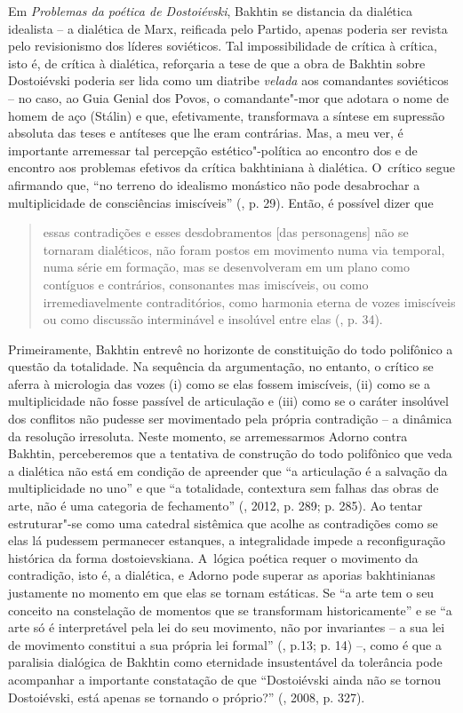 {{Em \emph{Problemas da poética de Dostoiévski}, Bakhtin se distancia da
dialética idealista -- a dialética de Marx, reificada pelo Partido,
apenas poderia ser revista pelo revisionismo dos líderes soviéticos. Tal
impossibilidade de crítica à crítica, isto é, de crítica à dialética,
reforçaria a tese de que a obra de Bakhtin sobre Dostoiévski poderia ser
lida como um diatribe \emph{velada} aos comandantes soviéticos -- no
caso, ao Guia Genial dos Povos, o comandante"-mor que adotara o nome de
homem de aço (Stálin) e que, efetivamente, transformava a síntese em
supressão absoluta das teses e antíteses que lhe eram contrárias. Mas, a
meu ver, é importante arremessar tal percepção estético"-política ao
encontro dos e de encontro aos problemas efetivos da crítica bakhtiniana
à dialética. O~crítico segue afirmando que, ``no terreno do idealismo
monástico não pode desabrochar a multiplicidade de consciências
imiscíveis'' (, p. 29). Então, é possível dizer que

\begin{quote}
essas contradições e esses desdobramentos {[}das personagens{]} não se
tornaram dialéticos, não foram postos em movimento numa via temporal,
numa série em formação, mas se desenvolveram em um plano como contíguos
e contrários, consonantes mas imiscíveis, ou como irremediavelmente
contraditórios, como harmonia eterna de vozes imiscíveis ou como
discussão interminável e insolúvel entre elas (, p. 34).
\end{quote}

Primeiramente, Bakhtin entrevê no horizonte de constituição do todo
polifônico a questão da totalidade. Na sequência da argumentação, no
entanto, o crítico se aferra à micrologia das vozes (i) como se elas
fossem imiscíveis, (ii) como se a multiplicidade não fosse passível de
articulação e (iii) como se o caráter insolúvel dos conflitos não
pudesse ser movimentado pela própria contradição -- a dinâmica da
resolução irresoluta. Neste momento, se arremessarmos Adorno contra
Bakhtin, perceberemos que a tentativa de construção do todo polifônico
que veda a dialética não está em condição de apreender que ``a
articulação é a salvação da multiplicidade no uno'' e que ``a
totalidade, contextura sem falhas das obras de arte, não é uma categoria
de fechamento'' (, 2012, p. 289; p. 285). Ao tentar estruturar"-se
como uma catedral sistêmica que acolhe as contradições como se elas lá
pudessem permanecer estanques, a integralidade impede a reconfiguração
histórica da forma dostoievskiana. A~lógica poética requer o movimento
da contradição, isto é, a dialética, e Adorno pode superar as aporias
bakhtinianas justamente no momento em que elas se tornam estáticas. Se
``a arte tem o seu conceito na constelação de momentos que se
transformam historicamente'' e se ``a arte só é interpretável pela lei
do seu movimento, não por invariantes -- a sua lei de movimento
constitui a sua própria lei formal'' (, p.13; p. 14) --, como é que
a paralisia dialógica de Bakhtin como eternidade insustentável da
tolerância pode acompanhar a importante constatação de que ``Dostoiévski
ainda não se tornou Dostoiévski, está apenas se tornando o próprio?''
(, 2008, p. 327).

}}
